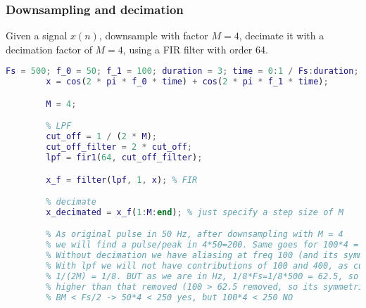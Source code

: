     \subsubsection{Downsampling and decimation}
    Given a signal $x(n)$, downsample with factor $M=4$, decimate it with a decimation factor of $M=4$, using a FIR filter with order 64.
    \begin{lstlisting}[language=Matlab, escapeinside=`']
        Fs = 500; f_0 = 50; f_1 = 100; duration = 3; time = 0:1 / Fs:duration;
        x = cos(2 * pi * f_0 * time) + cos(2 * pi * f_1 * time);

        M = 4;

        % LPF
        cut_off = 1 / (2 * M);
        cut_off_filter = 2 * cut_off;
        lpf = fir1(64, cut_off_filter);

        x_f = filter(lpf, 1, x); % FIR

        % decimate
        x_decimated = x_f(1:M:end); % just specify a step size of M

        % As original pulse in 50 Hz, after downsampling with M = 4
        % we will find a pulse/peak in 4*50=200. Same goes for 100*4 = 400
        % Without decimation we have aliasing at freq 100 (and its symmetric 400)
        % With lpf we will not have contributions of 100 and 400, as cutoff was
        % 1/(2M) = 1/8. BUT as we are in Hz, 1/8*Fs=1/8*500 = 62.5, so any freq
        % higher than that removed (100 > 62.5 removed, so its symmetric removed as well)
        % BM < Fs/2 -> 50*4 < 250 yes, but 100*4 < 250 NO
    \end{lstlisting}

